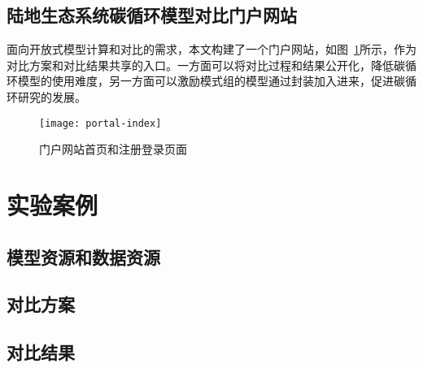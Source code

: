 \subsection{陆地生态系统碳循环模型对比门户网站}
面向开放式模型计算和对比的需求，本文构建了一个门户网站，如图~\ref{fig:portal-index}所示，作为对比方案和对比结果共享的入口。一方面可以将对比过程和结果公开化，降低碳循环模型的使用难度，另一方面可以激励模式组的模型通过封装加入进来，促进碳循环研究的发展。

\begin{figure}[!htbp]
    \centering
    \texttt{[image: portal-index]}
    \caption{门户网站首页和注册登录页面}
    \label{fig:portal-index}
\end{figure}



\section{实验案例}
\subsection{模型资源和数据资源}
\subsection{对比方案}
\subsection{对比结果}

